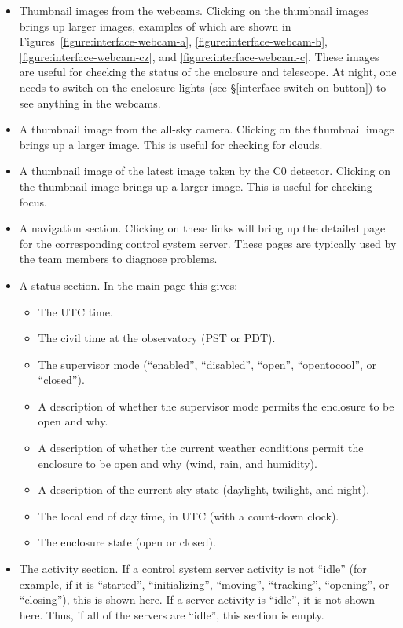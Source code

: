 \begin{itemize}
\item
Thumbnail images from the webcams. Clicking on the thumbnail images brings up larger images, examples of which are shown in Figures~\ref{figure:interface-webcam-a}, \ref{figure:interface-webcam-b}, \ref{figure:interface-webcam-cz}, and \ref{figure:interface-webcam-c}. These images are useful for checking the status of the enclosure and telescope. At night, one needs to switch on the enclosure lights (see \S\ref{interface-switch-on-button}) to see anything in the webcams.  
\item
A thumbnail image from the all-sky camera. Clicking on the thumbnail image brings up a larger image. This is useful for checking for clouds.
\item
A thumbnail image of the latest image taken by the C0 detector. Clicking on the thumbnail image brings up a larger image. This is useful for checking focus.
\item
A navigation section. Clicking on these links will bring up the detailed page for the corresponding control system server. These pages are typically used by the team members to diagnose problems.
\item
A status section. In the main page this gives:
\begin{itemize}
\item
The UTC time.
\item
The civil time at the observatory (PST or PDT).
\item
The supervisor mode (“enabled”, “disabled”, “open”, “opentocool”, or “closed”).
\item
A description of whether the supervisor mode permits the enclosure to be open and why.
\item
A description of whether the current weather conditions permit the enclosure to be open and why (wind, rain, and humidity).
\item
A description of the current sky state (daylight, twilight, and night).
\item
The local end of day time, in UTC (with a count-down clock).

\item
The enclosure state (open or closed).

\end{itemize}
\item
The activity section. If a control system server activity is not “idle” (for example, if it is “started”, “initializing”, “moving”, “tracking”, “opening”, or “closing”), this is shown here. If a server activity is “idle”, it is not shown here. Thus, if all of the servers are “idle”, this section is empty.


\end{itemize}
